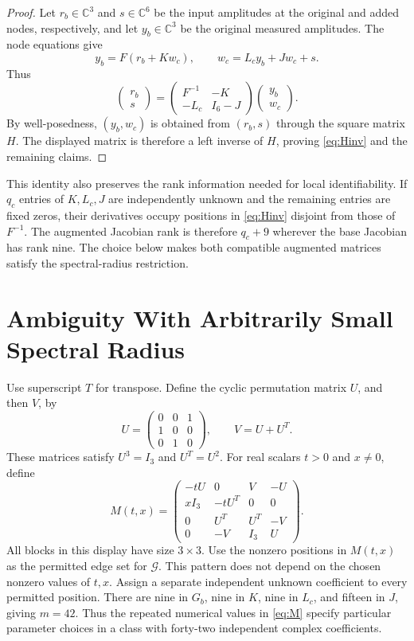 \documentclass[letterpaper,10pt,conference]{ieeeconf}
\newcommand{\aicite}{\texorpdfstring{\protect\cite{codex}}{}}
\begin{document}
\begin{proof}
Let \(r_b\in\mathbb C^3\) and \(s\in\mathbb C^6\) be the input amplitudes
at the original and added nodes, respectively, and let \(y_b\in\mathbb C^3\)
be the original measured amplitudes. The node equations give
\[
 y_b=F(r_b+Kw_c),\qquad w_c=L_cy_b+Jw_c+s.
\]
Thus
\[
 \begin{pmatrix}r_b\\s\end{pmatrix}
 =\begin{pmatrix}F^{-1}&-K\\-L_c&I_6-J\end{pmatrix}
  \begin{pmatrix}y_b\\w_c\end{pmatrix}.
\]
By well-posedness, \((y_b,w_c)\) is obtained from \((r_b,s)\) through
the square matrix \(H\). The displayed matrix is therefore a left
inverse of \(H\), proving \eqref{eq:Hinv} and the remaining claims.
\end{proof}

This identity also preserves the rank information needed for local
identifiability. If \(q_c\) entries of \(K,L_c,J\) are independently
unknown and the remaining entries are fixed zeros, their derivatives
occupy positions in \eqref{eq:Hinv} disjoint from those of \(F^{-1}\).
The augmented Jacobian rank is therefore \(q_c+9\) wherever the base
Jacobian has rank nine. The choice below makes both compatible
augmented matrices satisfy the spectral-radius restriction.

\section{Ambiguity With Arbitrarily Small Spectral Radius \aicite}
\label{sec:main}

Use superscript \(T\) for transpose. Define the cyclic permutation
matrix \(U\), and then \(V\), by
\[
 U=\begin{pmatrix}0&0&1\\1&0&0\\0&1&0\end{pmatrix},
 \qquad V=U+U^T.
\]
These matrices satisfy
\(U^3=I_3\) and \(U^T=U^2\).
For real scalars \(t>0\) and \(x\ne0\), define
\begin{equation}\label{eq:M}
 M(t,x)=
 \begin{pmatrix}
 -tU&0&V&-U\\
 xI_3&-tU^T&0&0\\
 0&U^T&U^T&-V\\
 0&-V&I_3&U
 \end{pmatrix}.
\end{equation}
All blocks in this display have size \(3\times3\).
Use the nonzero positions in \(M(t,x)\) as the permitted edge set
for \(\mathcal G\). This pattern does not depend on the chosen
nonzero values of \(t,x\).
Assign a separate independent unknown coefficient to every permitted
position. There are nine in \(G_b\), nine in \(K\), nine in \(L_c\),
and fifteen in \(J\), giving \(m=42\).
Thus the repeated numerical values in \eqref{eq:M} specify particular
parameter choices in a class with forty-two independent complex coefficients.
\end{document}
